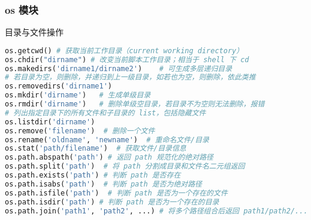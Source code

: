 \subsubsection{os 模块}
目录与文件操作
\begin{lstlisting}[language=python]
os.getcwd() # 获取当前工作目录（current working directory）
os.chdir("dirname") # 改变当前脚本工作目录；相当于 shell 下 cd
os.makedirs('dirname1/dirname2')    # 可生成多层递归目录
# 若目录为空，则删除，并递归到上一级目录，如若也为空，则删除，依此类推
os.removedirs('dirname1')
os.mkdir('dirname')   # 生成单级目录
os.rmdir('dirname')   # 删除单级空目录，若目录不为空则无法删除，报错
# 列出指定目录下的所有文件和子目录的 list，包括隐藏文件
os.listdir('dirname')
os.remove('filename')  # 删除一个文件
os.rename('oldname', 'newname')  # 重命名文件/目录
os.stat('path/filename')  # 获取文件/目录信息
os.path.abspath('path') # 返回 path 规范化的绝对路径
os.path.split('path')  # 将 path 分割成目录和文件名二元组返回
os.path.exists('path') # 判断 path 是否存在
os.path.isabs('path')  # 判断 path 是否为绝对路径
os.path.isfile('path')  # 判断 path 是否为一个存在的文件
os.path.isdir('path') # 判断 path 是否为一个存在的目录
os.path.join('path1', 'path2', ...) # 将多个路径组合后返回 path1/path2/... （最后没有 /）
\end{lstlisting}
